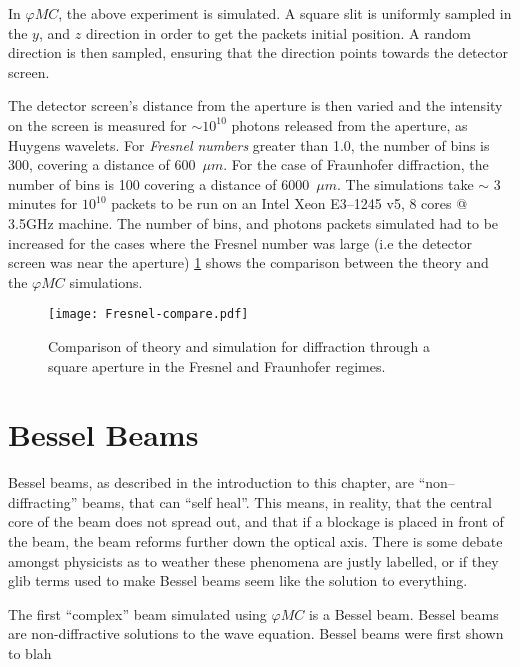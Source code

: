 \medskip

In $\varphi MC$, the above experiment is simulated. 
A square slit is uniformly sampled in the $y$, and $z$ direction in order to get the packets initial position. 
A random direction is then sampled, ensuring that the direction points towards the detector screen.

The detector screen's distance from the aperture is then varied and the intensity on the screen is measured for $\sim 10^{10}$ photons released from the aperture, as Huygens wavelets.
For \textit{Fresnel numbers} greater than 1.0, the number of bins is 300, covering a distance of 600~$\mu m$. 
For the case of Fraunhofer diffraction, the number of bins is 100 covering a distance of 6000~$\mu m$.
The simulations take $\sim$ 3 minutes for $10^{10}$ packets to be run on an Intel Xeon E3--1245 v5, 8 cores @ 3.5GHz machine.
The number of bins, and photons packets simulated had to be increased for the cases where the Fresnel number was large (i.e the detector screen was near the aperture)
\cref{fig:frescompare} shows the comparison between the theory and the $\varphi MC$ simulations.

\begin{figure}[!ht]
    \centering
    \texttt{[image: Fresnel-compare.pdf]}
    \caption{Comparison of theory and simulation for diffraction through a square aperture in the Fresnel and Fraunhofer regimes.}
    \label{fig:frescompare}
\end{figure}

\FloatBarrier

\section{Bessel Beams}

Bessel beams, as described in the introduction to this chapter, are ``non--diffracting'' beams, that can ``self heal''.
This means, in reality, that the central core of the beam does not spread out, and that if a blockage is placed in front of the beam, the beam reforms further down the optical axis.
There is some debate amongst physicists as to weather these phenomena are justly labelled, or if they glib terms used to make Bessel beams seem like the solution to everything.

The first ``complex'' beam simulated using $\varphi MC$ is a Bessel beam. 
Bessel beams are non-diffractive solutions to the wave equation. 
Bessel beams were first shown to blah



